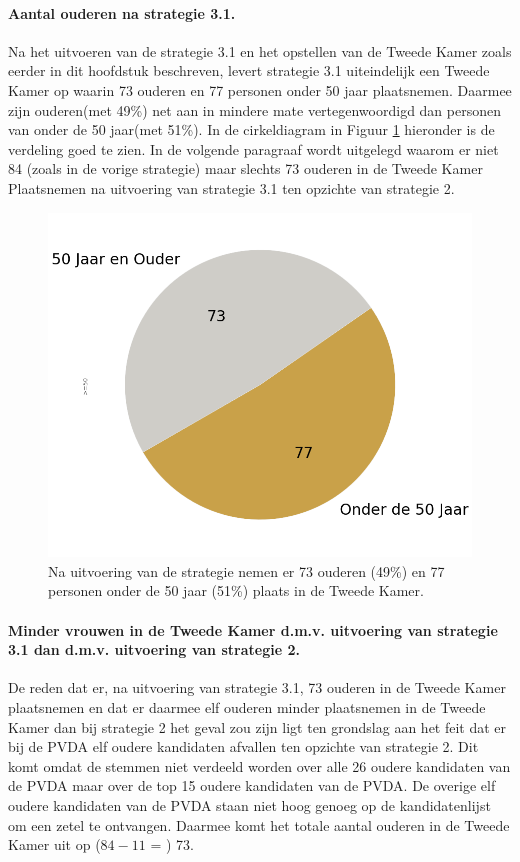 \paragraph{Aantal ouderen na strategie 3.1.}
Na het uitvoeren van de strategie 3.1 en het opstellen van de Tweede Kamer zoals eerder in dit hoofdstuk beschreven, levert strategie 3.1 uiteindelijk een Tweede Kamer op waarin 73 ouderen en 77 personen onder 50 jaar plaatsnemen. Daarmee zijn ouderen(met 49\%) net aan in mindere mate vertegenwoordigd dan personen van onder de 50 jaar(met 51\%). In de cirkeldiagram in Figuur \ref{fig:pcS31O} hieronder is de verdeling goed te zien. In de volgende paragraaf wordt uitgelegd waarom er niet 84 (zoals in de vorige strategie) maar slechts 73 ouderen in de Tweede Kamer Plaatsnemen na uitvoering van strategie 3.1 ten opzichte van strategie 2.

\begin{figure}[H]
\centering
	\includegraphics[width=0.42\linewidth]{pie_chart_top15_of_topN_ouderen.png}

			\caption{Na uitvoering van de strategie nemen er 73 ouderen (49\%) en 77 personen onder de 50 jaar (51\%) plaats in de Tweede Kamer.}

\label{fig:pcS31O}
\end{figure}

\paragraph{Minder vrouwen in de Tweede Kamer d.m.v. uitvoering van strategie 3.1 dan d.m.v. uitvoering van strategie 2.}
De reden dat er, na uitvoering van strategie 3.1, 73 ouderen in de Tweede Kamer plaatsnemen en dat er daarmee elf ouderen minder plaatsnemen in de Tweede Kamer dan bij strategie 2 het geval zou zijn ligt ten grondslag aan het feit dat er bij de PVDA elf oudere kandidaten afvallen ten opzichte van strategie 2. Dit komt omdat de stemmen niet verdeeld worden over alle 26 oudere kandidaten van de PVDA maar over de top 15 oudere kandidaten van de PVDA. De overige elf oudere kandidaten van de PVDA staan niet hoog genoeg op de kandidatenlijst om een zetel te ontvangen. Daarmee komt het totale aantal ouderen in de Tweede Kamer uit op ($84-11$ = ) 73.






